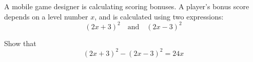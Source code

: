 \begin{question}
\noindent A mobile game designer is calculating scoring bonuses. A player's bonus score depends on a level number $x$, and is calculated using two expressions:
\[
(2x+3)^2 \quad \text{and} \quad (2x-3)^2
\]

\noindent Show that
\[
(2x+3)^2 - (2x-3)^2 = 24x
\]
\vspace{5cm}
\end{question}
